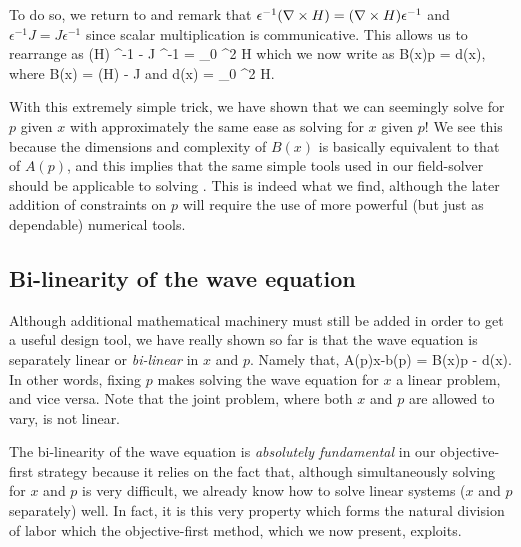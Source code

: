 To do so, we return to 
    and remark that 
    $\epsilon^{-1} (\nabla\times H) = (\nabla\times H) \epsilon^{-1}$ and
    $\epsilon^{-1} J = J \epsilon^{-1}$ 
    since scalar multiplication is communicative.
This allows us to rearrange  as
\BE \curl (\curl H) \epsilon^{-1} - \curl J \epsilon^{-1}  = \mu_0 \omega^2 H  \EE
which we now write as 
\BE B(x)p = d(x), \label{eq:Bd} \EE 
    where
\BE B(x) = \curl (\curl H) - \curl J\EE
    and 
\BE d(x)  = \mu_0 \omega^2 H.  \EE

With this extremely simple trick,
    we have shown that we can seemingly solve for $p$ given $x$
    with approximately the same ease as solving for $x$ given $p$!
We see this because the dimensions and complexity of $B(x)$ is basically
    equivalent to that of $A(p)$,
    and this implies that the same simple tools used in our field-solver
    should be applicable to solving .
This is indeed what we find, although the later addition of constraints on $p$
    will require the use of more powerful (but just as dependable) numerical tools.

\subsection{Bi-linearity of the wave equation}
Although additional mathematical machinery must still be added
    in order to get a useful design tool,
    we have really shown so far is that the wave equation is 
    separately linear or \emph{bi-linear} in $x$ and $p$.
Namely that,
\BE A(p)x-b(p) = B(x)p - d(x). \label{eq:bilinear} \EE
In other words, fixing $p$ makes solving the wave equation for $x$
    a linear problem, and vice versa.
Note that the joint problem,
    where both $x$ and $p$ are allowed to vary,
    is not linear.

The bi-linearity of the wave equation
    is \emph{absolutely fundamental} in our objective-first strategy
    because it relies on the fact
    that, although simultaneously solving for $x$ and $p$ is very difficult,
    we already know how to solve linear systems ($x$ and $p$ separately) well.
In fact, it is this very property which forms the natural division of labor
    which the objective-first method, which we now present, exploits.
